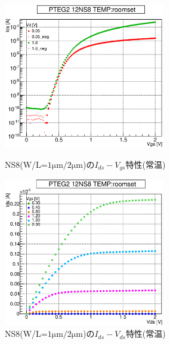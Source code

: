 				\begin{figure}[htbp]
					\begin{minipage}{0.5\hsize}
						\begin{center}
							\includegraphics[width=70mm]{./Chapter/Appendix/Picture/NST/NS8/PTEG2_12_NS8_IdVg_roomset.eps}
						\end{center}
						\caption{NS8(W/L=$1\mathrm{\mu m}/2\mathrm{\mu m}$)の$I_{ds}-V_{gs}$特性(常温)}
						\label{fig:NS8_IdVg_room}
					\end{minipage}
					\begin{minipage}{0.5\hsize}
						\begin{center}
							\includegraphics[width=70mm]{./Chapter/Appendix/Picture/NST/NS8/PTEG2_12_NS8_IdVd_roomset.eps}
						\end{center}
						\caption{NS8(W/L=$1\mathrm{\mu m}/2\mathrm{\mu m}$)の$I_{ds}-V_{ds}$特性(常温)}
						\label{fig:NS8_IdVd_room}
					\end{minipage}
				\end{figure}
				\clearpage
				
